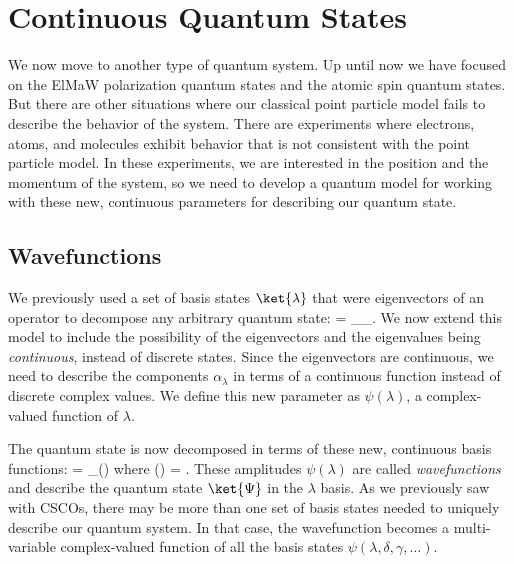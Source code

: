 \chapter{Continuous Quantum States}

We now move to another type of quantum system. Up until now we have focused on the ElMaW polarization quantum states and the atomic spin quantum states. But there are other situations where our classical point particle model fails to describe the behavior of the system. There are experiments where electrons, atoms, and molecules exhibit behavior that is not consistent with the point particle model. In these experiments, we are interested in the position and the momentum of the system, so we need to develop a quantum model for working with these new, continuous parameters for describing our quantum state.

\section{Wavefunctions}

We previously used a set of basis states $\ket{\lambda}$ that were eigenvectors of an operator to decompose any arbitrary quantum state:
\beq
\ket{\Psi} = \sum_\lambda \alpha_\lambda \ket{\lambda}.
\eeq\marginnote[-1cm]{\ref{tool:decom}}
We now extend this model to include the possibility of the eigenvectors and the eigenvalues being {\em continuous}, instead of discrete states. Since the eigenvectors are continuous, we need to describe the components $\alpha_\lambda$ in terms of a continuous function instead of discrete complex values. We define this new parameter as $\psi(\lambda)$, a complex-valued function of $\lambda$.

The quantum state is now decomposed in terms of these new, continuous basis functions:
\beq
\ket{\Psi} = \sum_\lambda \psi(\lambda)\ket{\lambda}
\eeq\marginnote[-1cm]{\ref{tool:orthog}}%
where
\beq
\psi(\lambda) = \avg{\lambda|\Psi}.
\label{eq:wavefunction}
\eeq{} 
These amplitudes $\psi(\lambda)$ are called {\em wavefunctions} and describe the quantum state $\ket{\Psi}$ in the $\lambda$ basis. As we previously saw with CSCOs, there may be more than one set of basis states needed to uniquely describe our quantum system. In that case, the wavefunction becomes a multi-variable complex-valued function of all the basis states $\psi(\lambda, \delta, \gamma, \ldots)$.


